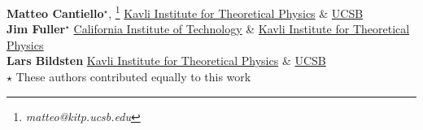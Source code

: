 \textbf{Matteo Cantiello}$^\star$, \footnote{\textit{matteo@kitp.ucsb.edu}} \href{https://www.authorea.com/inst/7192}{Kavli Institute for Theoretical Physics} \& \href{https://www.authorea.com/inst/7191}{UCSB} \\
\textbf{Jim Fuller}$^\star$ \href{https://www.authorea.com/inst/943}{California Institute of Technology} \& \href{https://www.authorea.com/inst/7192}{Kavli Institute for Theoretical Physics}\\
\textbf{Lars Bildsten} \href{https://www.authorea.com/inst/7192}{Kavli Institute for Theoretical Physics} \& \href{https://www.authorea.com/inst/7191}{UCSB}\\

$\star$ These authors contributed equally to this work
